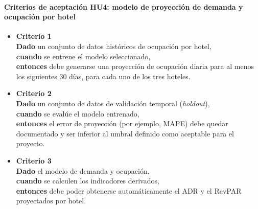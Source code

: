 \documentclass[
11pt, %
]{charter}
\begin{document}
\paragraph{Criterios de aceptación HU4: modelo de proyección de demanda y ocupación por hotel}
\begin{itemize}
  \item \textbf{Criterio 1} \\
  \textbf{Dado} un conjunto de datos históricos de ocupación por hotel, \\
  \textbf{cuando} se entrene el modelo seleccionado, \\
  \textbf{entonces} debe generarse una proyección de ocupación diaria para al menos los siguientes 30 días, para cada uno de los tres hoteles.

  \item \textbf{Criterio 2} \\
  \textbf{Dado} un conjunto de datos de validación temporal (\textit{holdout}), \\
  \textbf{cuando} se evalúe el modelo entrenado, \\
  \textbf{entonces} el error de proyección (por ejemplo, MAPE) debe quedar documentado y ser inferior al umbral definido como aceptable para el proyecto.

  \item \textbf{Criterio 3} \\
  \textbf{Dado} el modelo de demanda y ocupación, \\
  \textbf{cuando} se calculen los indicadores derivados, \\
  \textbf{entonces} debe poder obtenerse automáticamente el ADR y el RevPAR proyectados por hotel.
\end{itemize}

\vspace{1em}
\end{document}

